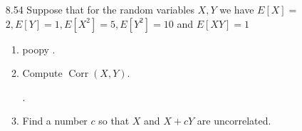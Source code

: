\documentclass[10pt]{article}
\begin{document}
\begin{itemize}
\newpage
 . \item[8.54] Suppose that for the random variables $X, Y$ we have $E[X]=$ $2, E[Y]=1, E\left[X^{2}\right]=5, E\left[Y^{2}\right]=10$ and $E[X Y]=1$

     \begin{enumerate}
 .    .\item poopy
 .     \item Compute $\operatorname{Corr}(X, Y)$.

 .     \item Find a number $c$ so that $X$ and $X+c Y$ are uncorrelated.
     \end{enumerate}
\end{itemize}
\end{document}
